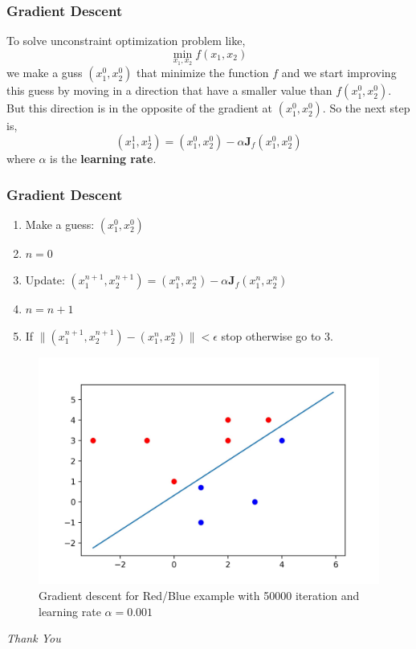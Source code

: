 \documentclass[12pt,aspectratio=169]{beamer}
\begin{document}
\begin{frame}
\frametitle{Gradient Descent}
To solve unconstraint optimization problem like,
\[
\min_{x_1,x_2}f(x_1,x_2)
\]
we make a guss $(x_1^0,x_2^0)$ that minimize the function $f$ and we start improving this guess by moving in a direction that have a smaller value than $f(x_1^0,x_2^0)$. But this direction is in the opposite of the gradient at $(x_1^0,x_2^0)$. So the next step is,
\[
(x_1^1,x_2^1)=(x_1^0,x_2^0)-\alpha\mathbf{J}_f(x_1^0,x_2^0)
\]
where $\alpha$ is the \textbf{learning rate}.
\end{frame}

\begin{frame}
\frametitle{Gradient Descent}
\begin{enumerate}
\item Make a guess: $(x_1^0,x_2^0)$
\smallskip
\item $n=0$
\smallskip
\item Update: $(x_1^{n+1},x_2^{n+1})=(x_1^{n},x_2^{n})-\alpha\mathbf{J}_f(x_1^{n},x_2^{n})$
\smallskip
\item $n=n+1$
\smallskip
\item If $\|(x_1^{n+1},x_2^{n+1})-(x_1^{n},x_2^{n})\|<\epsilon$ stop otherwise go to 3.

\end{enumerate}
\end{frame}

\begin{frame}
\begin{figure}
\centering
\includegraphics[scale=0.7]{GradDesc}
\caption{Gradient descent for Red/Blue example with 50000 iteration and learning rate $\alpha=0.001$}
\end{figure}
\end{frame}

\begin{frame}{}
  \centering \Huge
  \emph{Thank You}
\end{frame}
\end{document}
